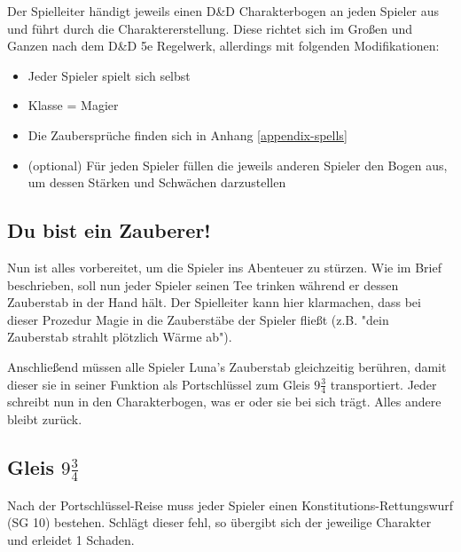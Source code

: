 \documentclass[]{scrartcl}
\begin{document}
Der Spielleiter händigt jeweils einen D\&D Charakterbogen an jeden Spieler aus und führt durch die Charaktererstellung. Diese richtet sich im Großen und Ganzen nach dem D\&D 5e Regelwerk, allerdings mit folgenden Modifikationen:
\begin{itemize}
	\item Jeder Spieler spielt sich selbst
	\item Klasse = Magier
	\item Die Zaubersprüche finden sich in Anhang \ref{appendix-spells}
	\item (optional) Für jeden Spieler füllen die jeweils anderen Spieler den Bogen aus, um dessen Stärken und Schwächen darzustellen
\end{itemize}

\subsection{Du bist ein Zauberer!}

Nun ist alles vorbereitet, um die Spieler ins Abenteuer zu stürzen. Wie im Brief beschrieben, soll nun jeder Spieler seinen Tee trinken während er dessen Zauberstab in der Hand hält. Der Spielleiter kann hier klarmachen, dass bei dieser Prozedur Magie in die Zauberstäbe der Spieler fließt (z.B. "dein Zauberstab strahlt plötzlich Wärme ab").

Anschließend müssen alle Spieler Luna's Zauberstab gleichzeitig berühren, damit dieser sie in seiner Funktion als Portschlüssel zum Gleis $9\frac{3}{4}$ transportiert. Jeder schreibt nun in den Charakterbogen, was er oder sie bei sich trägt. Alles andere bleibt zurück.

\subsection{\label{platform934}Gleis $9\frac{3}{4}$}

Nach der Portschlüssel-Reise muss jeder Spieler einen Konstitutions-Rettungswurf (SG 10) bestehen. Schlägt dieser fehl, so übergibt sich der jeweilige Charakter und erleidet 1 Schaden.

\end{document}
